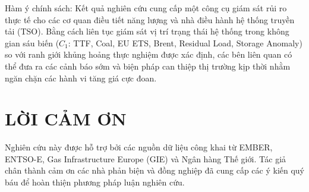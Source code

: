 Hàm ý chính sách: Kết quả nghiên cứu cung cấp một công cụ giám sát rủi ro thực tế cho các cơ quan điều tiết năng lượng và nhà điều hành hệ thống truyền tải (TSO). Bằng cách liên tục giám sát vị trí trạng thái hệ thống trong không gian sáu biến ($C_1$: TTF, Coal, EU ETS, Brent, Residual Load, Storage Anomaly) so với ranh giới khủng hoảng thực nghiệm được xác định, các bên liên quan có thể đưa ra các cảnh báo sớm và biện pháp can thiệp thị trường kịp thời nhằm ngăn chặn các hành vi tăng giá cực đoan.

\section*{LỜI CẢM ƠN}

Nghiên cứu này được hỗ trợ bởi các nguồn dữ liệu công khai từ EMBER, ENTSO-E, Gas Infrastructure Europe (GIE) và Ngân hàng Thế giới. Tác giả chân thành cảm ơn các nhà phản biện và đồng nghiệp đã cung cấp các ý kiến quý báu để hoàn thiện phương pháp luận nghiên cứu.
